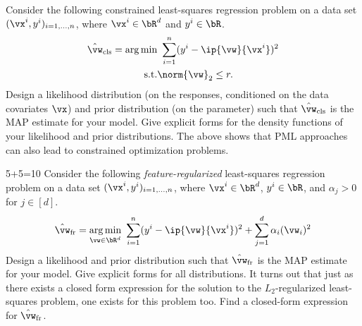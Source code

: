\begin{mlproblem}{5}
Consider the following constrained least-squares regression problem on a data set $(\vx^i,y^i)_{i=1,\ldots,n}$, where $\vx^i \in \bR^d$ and $y^i \in \bR$.
\begin{align*}
\hat\vw_\text{cls} = \arg\min&{}\ \sum_{i=1}^n(y^i - \ip{\vw}{\vx^i})^2\\
\text{s.t.}&{} \norm{\vw}_2 \leq r.
\end{align*}
Design a likelihood distribution (on the responses, conditioned on the data covariates $\vx$) and prior distribution (on the parameter) such that $\hat\vw_\text{cls}$ is the MAP estimate for your model. Give explicit forms for the density functions of your likelihood and prior distributions. The above shows that PML approaches can also lead to constrained optimization problems.
\end{mlproblem}

\begin{mlproblem}{5+5=10}
Consider the following \emph{feature-regularized} least-squares regression problem on a data set $(\vx^i,y^i)_{i=1,\ldots,n}$, where $\vx^i \in \bR^d$, $y^i \in \bR$, and $\alpha_j > 0$ for $j \in [d]$.
\[
\hat\vw_\text{fr} = \underset{\vw \in \bR^d}{\arg\min}\ \sum_{i=1}^n(y^i - \ip{\vw}{\vx^i})^2 + \sum_{j=1}^d\alpha_i(\vw_i)^2
\]
Design a likelihood and prior distribution such that $\hat\vw_\text{fr}$ is the MAP estimate for your model. Give explicit forms for all distributions. It turns out that just as there exists a closed form expression for the solution to the $L_2$-regularized least-squares problem, one exists for this problem too. Find a closed-form expression for $\hat\vw_\text{fr}$.
\end{mlproblem}

